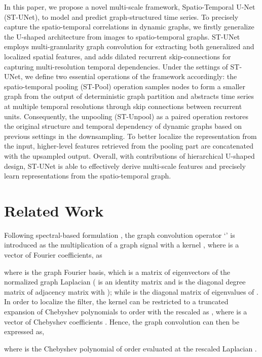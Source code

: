 \documentclass[sigconf,screen]{acmart}
\begin{document}
In this paper, we propose a novel multi-scale framework, Spatio-Temporal U-Net (ST-UNet), to model and predict graph-structured time series. To precisely capture the spatio-temporal correlations in dynamic graphs, we firstly generalize the U-shaped architecture from images to spatio-temporal graphs. ST-UNet employs multi-granularity graph convolution for extracting both generalized and localized spatial features, and adds dilated recurrent skip-connections for capturing multi-resolution temporal dependencies. Under the settings of ST-UNet, we define two essential operations of the framework accordingly: the spatio-temporal pooling (ST-Pool) operation samples nodes to form a smaller graph from the output of deterministic graph partition \cite{maue2007engineering} and abstracts time series at multiple temporal resolutions through skip connections between recurrent units. Consequently, the unpooling (ST-Unpool) as a paired operation restores the original structure and temporal dependency of dynamic graphs based on previous settings in the downsampling. To better localize the representation from the input, higher-level features retrieved from the pooling part are concatenated with the upsampled output. Overall, with contributions of hierarchical U-shaped design, ST-UNet is able to effectively derive multi-scale features and precisely learn representations from the spatio-temporal graph.


\section{Related Work}
Following spectral-based formulation \cite{bruna2013spectral,niepert2016learning,defferrard2016convolutional}, the graph convolution operator `' is introduced as the multiplication of a graph signal  with a kernel , where  is a vector of Fourier coefficients, as

where  is the graph Fourier basis, which is a matrix of eigenvectors of the normalized graph Laplacian  ( is an identity matrix and  is the diagonal degree matrix of adjacency matrix  with ); while  is the diagonal matrix of eigenvalues of  \cite{shuman2012emerging}. In order to localize the filter, the kernel  can be restricted to a truncated expansion of Chebyshev polynomials  to  order with the rescaled  as , where  is a vector of Chebyshev coefficients \cite{hammond2011wavelets}. Hence, the graph convolution can then be expressed as,

where  is the Chebyshev polynomial of order  evaluated at the rescaled Laplacian .
\end{document}
